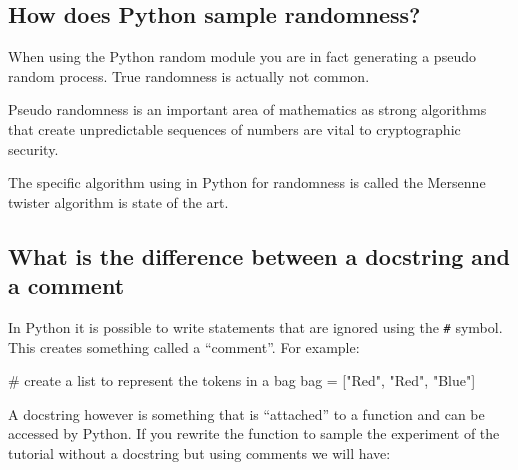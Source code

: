 \begin{raw}
\end{raw}







\subsection{How does Python sample randomness?}
\label{\detokenize{tools-for-mathematics/06-probability/why/main:how-does-python-sample-randomness}}

When using the Python random module you are in fact generating a pseudo random
process. True randomness is actually not common.


Pseudo randomness is an important area of mathematics as strong algorithms that
create unpredictable sequences of numbers are vital to cryptographic security.


The specific algorithm using in Python for randomness is called the Mersenne
twister algorithm is state of the art.


\subsection{What is the difference between a docstring and a comment}
\label{\detokenize{tools-for-mathematics/06-probability/why/main:what-is-the-difference-between-a-docstring-and-a-comment}}\label{\detokenize{tools-for-mathematics/06-probability/why/main:difference-between-a-docstring-and-a-comment}}

In Python it is possible to write statements that are ignored using the \texttt{\#}
symbol. This creates something called a “comment”. For example:




\begin{pyin}
# create a list to represent the tokens in a bag
bag = ["Red", "Red", "Blue"]
\end{pyin}

A docstring however is something that is “attached” to a function and can be
accessed by Python.
If you rewrite the function to sample the experiment of the tutorial without a
docstring but using comments we will have:





